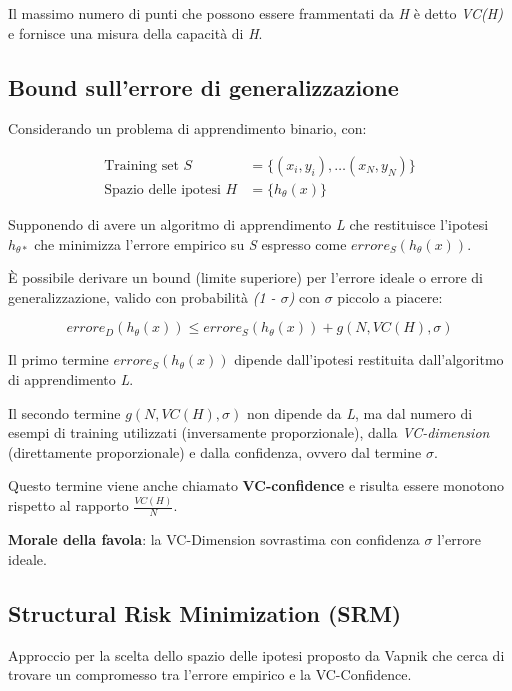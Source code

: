 Il massimo numero di punti che possono essere frammentati da \emph{H} è
detto \emph{VC(H)} e fornisce una misura della capacità di \emph{H}.

\subsection{Bound sull'errore di generalizzazione}\label{sec:vcc}

Considerando un problema di apprendimento binario, con:

\begin{align*}
\text{Training set }S &= \{(x_i,y_i), \ldots (x_N, y_N)\} \\
\text{Spazio delle ipotesi } H &=\{h_\theta(x)\} 
\end{align*}

Supponendo di avere un algoritmo di apprendimento \emph{L} che
restituisce l'ipotesi $h_{\theta*}$ che minimizza l'errore empirico su
\emph{S} espresso come $errore_S(h_\theta(x))$.

È possibile derivare un bound (limite superiore) per l'errore ideale o
errore di generalizzazione, valido con probabilità \emph{(1 - $\sigma$)} con
$\sigma$ piccolo a piacere:

$$
errore_D(h_\theta(x)) \leq  errore_S(h_{\theta}(x)) + g(N, VC(H), \sigma)
$$

Il primo termine $errore_S(h_{\theta}(x))$ dipende dall'ipotesi restituita
dall'algoritmo di apprendimento \textit{L}.

Il secondo termine $g(N, VC(H), \sigma)$ non dipende da \emph{L}, ma dal
numero di esempi di training utilizzati (inversamente proporzionale),
dalla \emph{VC-dimension} (direttamente proporzionale) e dalla
confidenza, ovvero dal termine $\sigma$.

Questo termine viene anche chiamato \textbf{VC-confidence} e risulta essere monotono rispetto al rapporto
$\frac{VC(H)}{N}$.

\textbf{Morale della favola}: la VC-Dimension sovrastima con confidenza $\sigma$ l'errore ideale.

\subsection{Structural Risk Minimization (SRM)}\label{sec:srm}

Approccio per la scelta dello spazio delle ipotesi proposto da Vapnik
che cerca di trovare un compromesso tra l'errore empirico e la
VC-Confidence.

